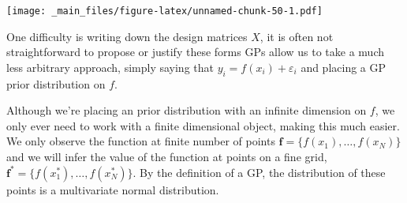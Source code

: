 \documentclass[
]{book}
\theoremstyle{definition}
\theoremstyle{definition}
\theoremstyle{definition}
\theoremstyle{definition}
\theoremstyle{remark}
\begin{document}
\texttt{[image: \_main\_files/figure-latex/unnamed-chunk-50-1.pdf]}

One difficulty is writing down the design matrices \(X\), it is often not straightforward to propose or justify these forms GPs allow us to take a much less arbitrary approach, simply saying that \(y_i = f(x_i) + \varepsilon_i\) and placing a GP prior distribution on \(f\).

Although we're placing an prior distribution with an infinite dimension on \(f\), we only ever need to work with a finite dimensional object, making this much easier. We only observe the function at finite number of points \(\boldsymbol{f} = \{f(x_1), \ldots, f(x_N)\}\) and we will infer the value of the function at points on a fine grid, \(\boldsymbol{f}^* = \{f(x_1^*), \ldots, f(x_N^*)\}\). By the definition of a GP, the distribution of these points is a multivariate normal distribution.
\end{document}
